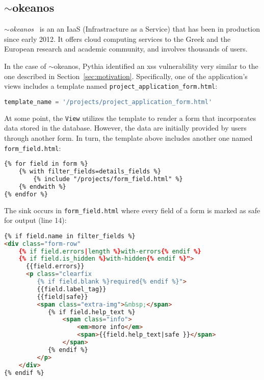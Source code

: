\vspace{-6mm}

\subsection{$\sim$okeanos}
\label{sec:okeanos}

$\sim${\it okeanos}~\cite{okeanos} is an
an IaaS (Infrastracture as a Service)
that has been in production since early 2012.
It offers cloud computing services to
the Greek and the European research and academic community,
and involves thousands of users.

In the case of $\sim$okeanos,
Pythia identified an {\sc xss} vulnerability
very similar to the one described in
	Section~\ref{sec:motivation}.
Specifically,
one of the application's views
includes a template named
{\tt project\_application\_form.html}:

\vspace{0.8mm}
\begin{lstlisting}[language=Python, basicstyle=\footnotesize\ttfamily]
 template_name = '/projects/project_application_form.html'
\end{lstlisting}
\vspace{0.8mm}

\noindent
At some point,
the {\tt View} utilizes the template to render a form
that incorporates data stored in the database.
However,
the data are initially provided by users
through another form.
In turn,
the template above
includes another one named
{\tt form\_field.html}:

\vspace{0.8mm}
\begin{lstlisting}[language=html,basicstyle=\footnotesize\ttfamily]
{% for field in form %}
    {% with filter_fields=details_fields %}
        {% include "/projects/form_field.html" %}
    {% endwith %}
{% endfor %}
\end{lstlisting}
\vspace{0.8mm}

\noindent
The sink occurs in {\tt form\_field.html}
where every field of a form is marked as safe
for output (line 14):

\vspace{0.8mm}
\begin{lstlisting}[language=html,basicstyle=\footnotesize\ttfamily]
{% if field.name in filter_fields %}
<div class="form-row"
    {% if field.errors|length %}with-errors{% endif %}
    {% if field.is_hidden %}with-hidden{% endif %}">
      {{field.errors}}
      <p class="clearfix
         {% if field.blank %}required{% endif %}">
         {{field.label_tag}}
         {{field|safe}}
         <span class="extra-img">&nbsp;</span>
            {% if field.help_text %}
                <span class="info">
                    <em>more info</em>
                    <span>{{field.help_text|safe }}</span>
                </span>
            {% endif %}
         </p>
    </div>
{% endif %}
\end{lstlisting}
\vspace{0.8mm}

